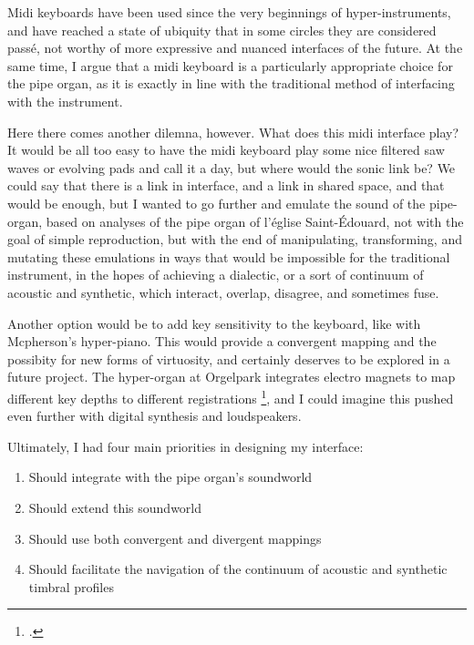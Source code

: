 \documentclass[12pt,twoside,maitrise]{dms_ks}
\theoremstyle{definition}
\begin{document}
Midi keyboards have been used since the very beginnings of hyper-instruments, and have reached a state of ubiquity that in some circles they are considered passé, not worthy of more expressive and nuanced interfaces of the future.
At the same time, I argue that a midi keyboard is a particularly appropriate choice for the pipe organ, as it is exactly in line with the traditional method of interfacing with the instrument.

Here there comes another dilemna, however.
What does this midi interface play?
It would be all too easy to have the midi keyboard play some nice filtered saw waves or evolving pads and call it a day, but where would the sonic link be?
We could say that there is a link in interface, and a link in shared space, and that would be enough, but I wanted to go further and emulate the sound of the pipe-organ, based on analyses of the pipe organ of l'église Saint-Édouard, not with the goal of simple reproduction, but with the end of manipulating, transforming, and mutating these emulations in ways that would be impossible for the traditional instrument, in the hopes of achieving a dialectic, or a sort of continuum of acoustic and synthetic, which interact, overlap, disagree, and sometimes fuse.

Another option would be to add key sensitivity to the keyboard, like with Mcpherson's hyper-piano. This would provide a convergent mapping and the possibity for new forms of virtuosity, and certainly deserves to be explored in a future project. The hyper-organ at Orgelpark integrates electro magnets to map different key depths to different registrations \footcite[14]{van_heumen_new_2014}, and I could imagine this pushed even further with digital synthesis and loudspeakers. 

Ultimately, I had four main priorities in designing my interface:

\begin{enumerate}
  \item Should integrate with the pipe organ's soundworld

  \item Should extend this soundworld
   
  \item Should use both convergent and divergent mappings

  \item Should facilitate the navigation of the continuum of acoustic
and synthetic timbral profiles
\end{enumerate}
\end{document}
